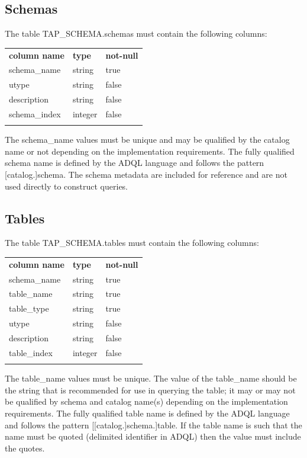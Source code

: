 \documentclass[11pt,letter]{ivoa}
\newcommand{\tapschema}{TAP\_SCHE\-MA}
\newcommand{\tapschema}{\mbox{%
  \relsize{-0.5}TAP\discretionary{-}{}{\kern-2pt\_}SCHEMA}}
\begin{document}
\subsection{Schemas}
\label{sec:tap-schema-schemas}

The table \tapschema.schemas must contain the following columns:

\begin{inlinetable}
\begin{tabular}{l l l}
\sptablerule
\textbf{column name} & \textbf{type} & \textbf{not-null} \\
\sptablerule
schema\_name & string & true \\
utype & string & false \\
description & string & false \\
schema\_index & integer & false \\
\sptablerule
\end{tabular}
\end{inlinetable}

The schema\_name values must be unique and may be qualified by the 
catalog name or not depending on the implementation requirements. The fully 
qualified schema name is defined by the ADQL language and  follows the pattern 
[catalog.]schema. The schema metadata are included for reference and are not 
used directly to construct queries.

\subsection{Tables}
\label{sec:tap-schema-tables}
The table \tapschema.tables must contain the following columns:

\begin{inlinetable}
\begin{tabular}{l l l}
\sptablerule
\textbf{column name} & \textbf{type} & \textbf{not-null} \\
\sptablerule
schema\_name & string & true \\
table\_name & string & true \\
table\_type & string & true \\
utype & string & false \\
description & string & false \\
table\_index & integer & false \\
\sptablerule
\end{tabular}
\end{inlinetable}

The table\_name values must be unique. The value of the 
table\_name should be the string that is recommended for use in 
querying the table; it may or may not be qualified by schema and catalog name(s) 
depending on the implementation requirements. The fully qualified table name is 
defined by the ADQL language and follows the pattern [[catalog.]schema.]table. 
If the table name is such that the name must be quoted (delimited identifier in 
ADQL) then the value must include the quotes.
\end{document}
